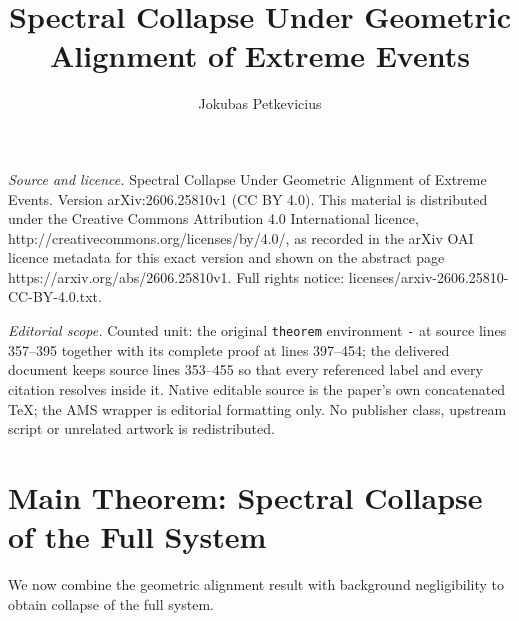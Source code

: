 \documentclass[10pt,a4paper]{amsart}
\begin{document}
\title[Spectral Collapse Under Geometric Alignment of Extreme Event]{Spectral Collapse Under Geometric Alignment of Extreme Events}
\author{Jokubas Petkevicius}
\date{}
\maketitle
\noindent\emph{Source and licence.} Spectral Collapse Under Geometric Alignment of Extreme Events. Version arXiv:2606.25810v1 (CC BY 4.0). This material is distributed under the Creative Commons Attribution 4.0 International licence, http://creativecommons.org/licenses/by/4.0/, as recorded in the arXiv OAI licence metadata for this exact version and shown on the abstract page https://arxiv.org/abs/2606.25810v1. Full rights notice: licenses/arxiv-2606.25810-CC-BY-4.0.txt.\par\smallskip
\noindent\textit{Editorial scope.} Counted unit: the original \texttt{theorem} environment \texttt{-} at source lines 357--395 together with its complete proof at lines 397--454; the delivered document keeps source lines 353--455 so that every referenced label and every citation resolves inside it. Native editable source is the paper's own concatenated TeX; the AMS wrapper is editorial formatting only. No publisher class, upstream script or unrelated artwork is redistributed.
\section{Main Theorem: Spectral Collapse of the Full System}

We now combine the geometric alignment result with background negligibility to obtain collapse of the full system.
\end{document}
